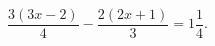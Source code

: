 \begin{ex}[type=equation]
	\begin{condition}
		$\dfrac{3(3x - 2)}{4}-\dfrac{2(2x + 1)}{3} = 1\dfrac{1}{4}.$
	\end{condition}
\end{ex}